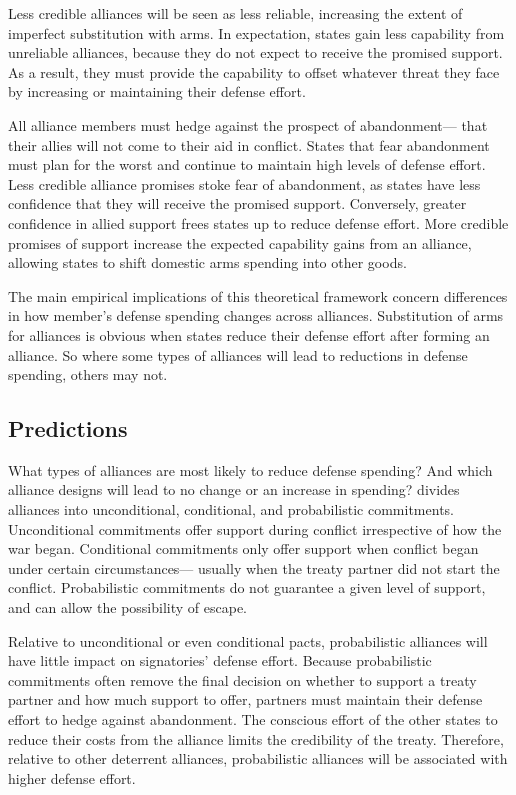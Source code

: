 \documentclass[12pt]{article}
\begin{document}
Less credible alliances will be seen as less reliable, increasing the extent of imperfect substitution with arms. In expectation, states gain less capability from unreliable alliances, because they do not expect to receive the promised support. As a result, they must provide the capability to offset whatever threat they face by increasing or maintaining their defense effort.

All alliance members must hedge against the prospect of abandonment--- that their allies will not come to their aid in conflict. States that fear abandonment must plan for the worst and continue to maintain high levels of defense effort. Less credible alliance promises stoke fear of abandonment, as states have less confidence that they will receive the promised support. Conversely, greater confidence in allied support frees states up to reduce defense effort. More credible promises of support increase the expected capability gains from an alliance, allowing states to shift domestic arms spending into other goods. 

The main empirical implications of this theoretical framework concern differences in how member's defense spending changes across alliances. Substitution of arms for alliances is obvious when states reduce their defense effort after forming an alliance. So where some types of alliances will lead to reductions in defense spending, others may not. 

\subsection*{Predictions}

What types of alliances are most likely to reduce defense spending? And which alliance designs will lead to no change or an increase in spending? \citet{Benson2011, Benson2012} divides alliances into unconditional, conditional, and probabilistic commitments. Unconditional commitments offer support during conflict irrespective of how the war began. Conditional commitments only offer support when conflict began under certain circumstances--- usually when the treaty partner did not start the conflict. Probabilistic commitments do not guarantee a given level of support, and can allow the possibility of escape. 

Relative to unconditional or even conditional pacts, probabilistic alliances will have little impact on signatories' defense effort. Because probabilistic commitments often remove the final decision on whether to support a treaty partner and how much support to offer, partners must maintain their defense effort to hedge against abandonment. The conscious effort of the other states to reduce their costs from the alliance limits the credibility of the treaty. Therefore, relative to other deterrent alliances, probabilistic alliances will be associated with higher defense effort. 
\end{document}
